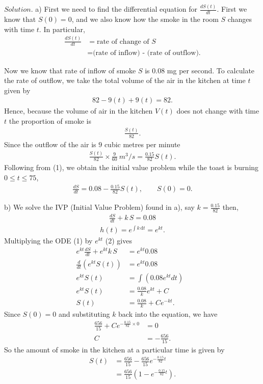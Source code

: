 \documentclass{article}
\begin{document}
$Solution.$ a) First we need to find the differential equation for
$\frac{dS(t)}{dt}.$ First we know that $S(0) = 0$, and we also 
know how the smoke in the room $S$ changes with time $t$.
In particular, 
\begin{align*}
  \frac{dS(t)}{dt} &= \text{rate of change of } S\\
  &= \text{(rate of inflow) - (rate of outflow).} \tag{1}
\end{align*}

Now we know that rate of inflow of smoke $S$ is $0.08$ mg 
per second. To calculate the rate of outflow, we take the 
total volume of the air in the kitchen at time $t$ given by
\begin{align*}
  82 - 9(t) + 9(t) = 82.
\end{align*}
Hence, because the volume of air in the kitchen $V(t)$ does not 
change with time $t$ the proportion of smoke is
\begin{align*}
  \frac{S(t)}{82}.
\end{align*}
Since the outflow of the air is $9$ cubic metres per minute
\begin{align*}
  \frac{S(t)}{82} \times \frac{9}{60} \ m^3/s 
  = \frac{0.15}{82} S(t).
\end{align*}
Following from (1), we obtain the initial value problem while 
the toast is burning $0 \leq t \leq 75$,
\begin{align*}
  \frac{dS}{dt} = 0.08 - \frac{0.15}{82}S(t)
  , \qquad S(0) = 0.
\end{align*}

b) We solve the IVP (Initial Value Problem) found in a), say $k = \frac{0.15}{82}$ then,
\begin{align}
  \frac{dS}{dt} + k\,S = 0.08
\end{align}
\begin{align}
  h(t) = e^{\int k\,\mathrm{d}t}
  = e^{kt}.
\end{align}
Multiplying the ODE (1) by $e^{kt}$ (2) gives
\begin{align*}
  e^{kt}\frac{dS}{dt} + e^{kt}k\,S &= e^{kt}0.08  \\
  \frac{d}{dt}(e^{kt} S(t)) &= e^{kt}0.08  \\
  e^{kt}S(t) &= \int (0.08e^{kt}dt) \\
  e^{kt}S(t) &= \frac{0.08}{k}e^{kt} + C \\
  S(t) &= \frac{0.08}{k} + Ce^{-kt}. 
  \qquad
\end{align*}
Since $S(0) = 0$ and substituting $k$ back into the equation, we have
\begin{align*}
  \frac{656}{15} + Ce^{-\frac{0.15}{82}\times0} &= 0 \\
  C &= -\frac{656}{15}.
\end{align*}
So the amount of smoke in the kitchen at a particular time
is given by
\begin{align*}
  S(t) &= \frac{656}{15} -\frac{656}{15}e^{-\frac{0.15}{82}t} \\
  &= \frac{656}{15}(1-e^{-\frac{0.15}{82}t})  \tag{3}.
\end{align*}
\end{document}
